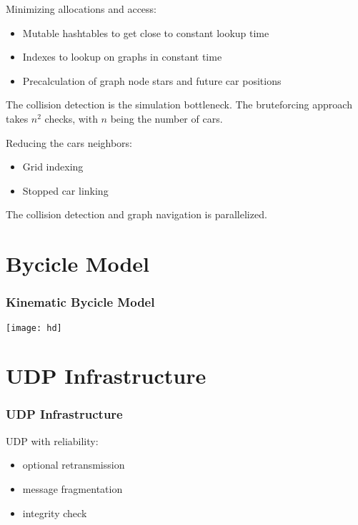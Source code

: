 \documentclass{beamer}
\begin{document}
\begin{frame}
	Minimizing allocations and access:
	\begin{itemize}
		\item Mutable hashtables to get close to constant lookup time
		\item Indexes to lookup on graphs in constant time
		\item Precalculation of graph node stars and future car positions
	\end{itemize}
\end{frame}

\begin{frame}
	The collision detection is the simulation bottleneck. The bruteforcing approach takes \begin{math} n^2 \end{math} checks, with \begin{math} n \end{math} being the number of cars.  \\
\end{frame}


\begin{frame}
	Reducing the cars neighbors:
	\begin{itemize}
		\item Grid indexing
		\item Stopped car linking
	\end{itemize}
\end{frame}

\begin{frame}
	The collision detection and graph navigation is parallelized.
\end{frame}

\section{Bycicle Model}
\begin{frame}
	\frametitle{Kinematic Bycicle Model}
\texttt{[image: hd]}
\end{frame}


\section{UDP Infrastructure}
\begin{frame}
	\frametitle{UDP Infrastructure}
UDP with reliability:
\begin{itemize}
	\item optional retransmission
	\item message fragmentation
	\item integrity check
\end{itemize}
\end{frame}
\end{document}
